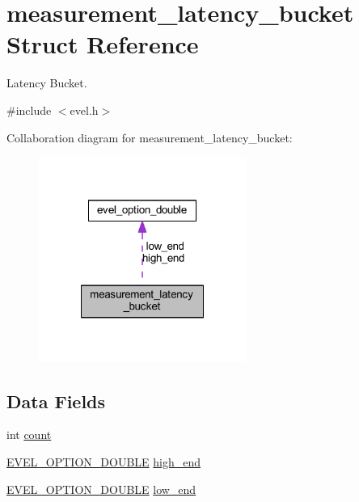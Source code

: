\hypertarget{structmeasurement__latency__bucket}{}\section{measurement\+\_\+latency\+\_\+bucket Struct Reference}
\label{structmeasurement__latency__bucket}


Latency Bucket.  




{\ttfamily \#include $<$evel.\+h$>$}



Collaboration diagram for measurement\+\_\+latency\+\_\+bucket\+:
\nopagebreak
\begin{figure}[H]
\begin{center}
\leavevmode
\includegraphics[width=192pt]{structmeasurement__latency__bucket__coll__graph}
\end{center}
\end{figure}
\subsection*{Data Fields}
\begin{DoxyCompactItemize}
\item 
int \hyperlink{structmeasurement__latency__bucket_a5957e2d644bce4e4403ce381aca6bc93}{count}
\item 
\hyperlink{evel_8h_aafc42b3cd9aca88804c3d413e4ccec06}{E\+V\+E\+L\+\_\+\+O\+P\+T\+I\+O\+N\+\_\+\+D\+O\+U\+B\+LE} \hyperlink{structmeasurement__latency__bucket_a0262bdf5074643c3f1d2ed3d1c6a3342}{high\+\_\+end}
\item 
\hyperlink{evel_8h_aafc42b3cd9aca88804c3d413e4ccec06}{E\+V\+E\+L\+\_\+\+O\+P\+T\+I\+O\+N\+\_\+\+D\+O\+U\+B\+LE} \hyperlink{structmeasurement__latency__bucket_a91976b4df5f1d47211bb73a54e7a2d91}{low\+\_\+end}
\end{DoxyCompactItemize}


